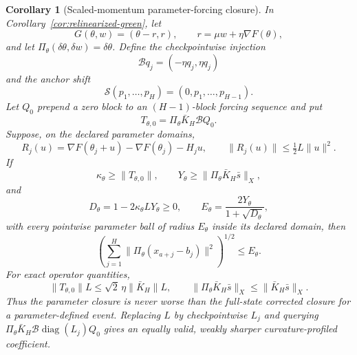 \documentclass{article}
\newtheorem{corollary}{Corollary}
\begin{document}
\begin{corollary}[Scaled-momentum parameter-forcing closure]
\label{cor:parameter-forcing}
In Corollary~\ref{cor:relinearized-green}, let
\begin{equation}
 G(\theta,w)=(\theta-r,r),\qquad
 r=\mu w+\eta\nabla F(\theta),
 \label{eq:scaled-momentum-factorization}
\end{equation}
and let $\Pi_\theta(\delta\theta,\delta w)=\delta\theta$.  Define the
checkpointwise injection
\begin{equation}
 \mathcal Bq_j=(-\eta q_j,\eta q_j)
\end{equation}
and the anchor shift
\begin{equation}
 \mathcal S(p_1,\ldots,p_H)=(0,p_1,\ldots,p_{H-1}).
 \label{eq:anchor-shift}
\end{equation}
Let $Q_0$ prepend a zero block to an $(H-1)$-block forcing sequence and put
\begin{equation}
 T_{\theta,0}=\Pi_\theta\bar K_H\mathcal BQ_0.
 \label{eq:parameter-green}
\end{equation}
Suppose, on the declared parameter domains,
\begin{equation}
 R_j(u)=\nabla F(\theta_j+u)-\nabla F(\theta_j)-H_ju,
 \qquad \|R_j(u)\|\le \tfrac12L\|u\|^2.
 \label{eq:objective-gradient-remainder}
\end{equation}
If
\begin{equation}
 \kappa_\theta\ge\|T_{\theta,0}\|,\qquad
 Y_\theta\ge\|\Pi_\theta\bar K_H\bar s\|_X,
\end{equation}
and
\begin{equation}
 D_\theta=1-2\kappa_\theta L Y_\theta\ge0,\qquad
 E_\theta=\frac{2Y_\theta}{1+\sqrt{D_\theta}},
 \label{eq:parameter-root}
\end{equation}
with every pointwise parameter ball of radius $E_\theta$ inside its declared
domain, then
\begin{equation}
 \left(\sum_{j=1}^{H}
 \|\Pi_\theta(x_{a+j}-b_j)\|^2\right)^{1/2}\le E_\theta.
 \label{eq:parameter-tube}
\end{equation}
For exact operator quantities,
\begin{equation}
 \|T_{\theta,0}\|L
 \le \sqrt2\,\eta\|\bar K_H\|L,\qquad
 \|\Pi_\theta\bar K_H\bar s\|_X
 \le\|\bar K_H\bar s\|_X.
 \label{eq:parameter-dominance}
\end{equation}
Thus the parameter closure is never worse than the full-state corrected
closure for a parameter-defined event.  Replacing $L$ by checkpointwise
$L_j$ and querying
$\Pi_\theta\bar K_H\mathcal B
\operatorname{diag}(L_j)Q_0$ gives an equally valid, weakly sharper
curvature-profiled coefficient.
\end{corollary}
\end{document}
